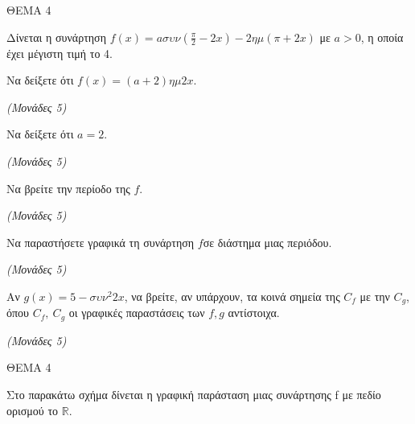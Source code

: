 \documentclass[11pt,a4paper,twoside]{book}
\newcommand{\monades}[1]{\hfill \textit{(Μονάδες #1)}}
\begin{document}
\vspace{4mm}

ΘΕΜΑ 4

Δίνεται η συνάρτηση $f(x) = a\sigma\upsilon\nu(\frac{\pi}{2} - 2x) - 2\eta\mu(\pi + 2x)$ με $a > 0$, η οποία έχει μέγιστη τιμή το 4.

\begin{alist}
\item Να δείξετε ότι $f(x) = (a + 2)\eta\mu 2x$.

\monades{5}

\item

\end{alist}
\begin{alist}
\item
  Να δείξετε ότι $a = 2$.

\monades{5}


\end{alist}
\begin{alist}
\item
  Να βρείτε την περίοδο της $f$.

\monades{5}

\item Να παραστήσετε γραφικά τη συνάρτηση $f$σε διάστημα μιας περιόδου.

\monades{5}

\item Αν $g(x) = 5 - {\sigma\upsilon\nu}^{2}2x$, να βρείτε, αν υπάρχουν, τα κοινά σημεία της $C_{f}$ με την $C_{g}$, όπου $C_{f},\ C_{g}$ οι γραφικές παραστάσεις των $f,g$ αντίστοιχα.

\monades{5}
\end{alist}

\vspace{4mm}

ΘΕΜΑ 4

Στο παρακάτω σχήμα δίνεται η γραφική παράσταση μιας συνάρτησης f με πεδίο ορισμού το $\mathbb{R}$.
\end{document}
